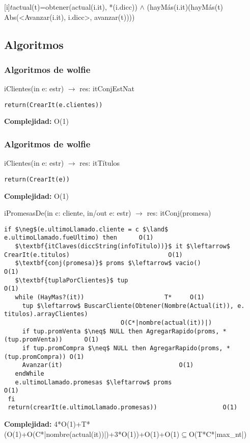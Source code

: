 
 [i]{$t$}{actual(t)=obtener(actual(i.it), *(i.dicc)) $\land$ (hayM\'as(i.it)\impluego (hayM\'as(t) \yluego Abs(<Avanzar(i.it), i.dicc>, avanzar(t))))}


\subsection{Algoritmos}
\lstset { %
    showstringspaces=false,
}
\subsubsection{Algoritmos de wolfie}
iClientes(in e: estr) $\rightarrow$ res: itConjEstNat
\begin{lstlisting}[mathescape]
  return(CrearIt(e.clientes))
\end{lstlisting}
\textbf{Complejidad:} O(1)

\subsubsection{Algoritmos de wolfie}
iClientes(in e: estr) $\rightarrow$ res: itT\'itulos
\begin{lstlisting}[mathescape]
  return(CrearIt(e))
\end{lstlisting}
\textbf{Complejidad:} O(1)

iPromesasDe(in c: cliente, in/out e: estr) $\rightarrow$ res: itConj(promesa)
\begin{lstlisting}[mathescape]
 if $\neg$(e.ultimoLlamado.cliente = c $\land$ e.ultimoLlamado.fueUltimo) then		O(1)
   $\textbf{itClaves(diccString(infoTitulo))}$ it $\leftarrow$ CrearIt(e.titulos)							O(1)
   $\textbf{conj(promesa)}$ proms $\leftarrow$ vacio() 								O(1)
   $\textbf{tuplaPorClientes}$ tup										O(1)
   while (HayMas?(it))						T*	   O(1)
     tup $\leftarrow$ BuscarCliente(Obtener(Nombre(Actual(it)), e. titulos).arrayClientes)	
     							O(C*|nombre(actual(it))|)
     if tup.promVenta $\neq$ NULL then AgregarRapido(proms, *(tup.promVenta))	   O(1)
     if tup.promCompra $\neq$ NULL then AgregarRapido(proms, *(tup.promCompra)) O(1)
     Avanzar(it)								O(1)
   endWhile
   e.ultimoLlamado.promesas $\leftarrow$ proms						O(1)
 fi
 return(crearIt(e.ultimoLlamado.promesas))					O(1)
\end{lstlisting}
\textbf{Complejidad:} 4*O(1)+T*(O(1)+O(C*|nombre(actual(it))|)+3*O(1))+O(1)+O(1)$\subseteq$O(T*C*|max\_nt|)

